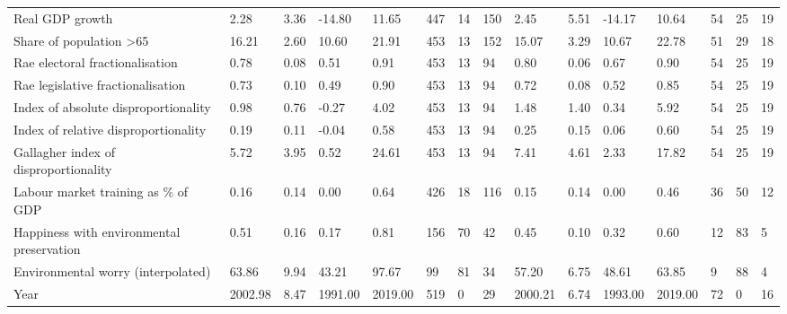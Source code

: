 \begin{longtable}{lllllllllllllll}
Real GDP growth & 2.28 & 3.36 & -14.80 & 11.65 & 447 & 14 & 150 & 2.45 & 5.51 & -14.17 & 10.64 & 54 & 25 & 19\\
Share of population >65 & 16.21 & 2.60 & 10.60 & 21.91 & 453 & 13 & 152 & 15.07 & 3.29 & 10.67 & 22.78 & 51 & 29 & 18\\
\addlinespace
Rae electoral fractionalisation & 0.78 & 0.08 & 0.51 & 0.91 & 453 & 13 & 94 & 0.80 & 0.06 & 0.67 & 0.90 & 54 & 25 & 19\\
Rae legislative fractionalisation & 0.73 & 0.10 & 0.49 & 0.90 & 453 & 13 & 94 & 0.72 & 0.08 & 0.52 & 0.85 & 54 & 25 & 19\\
Index of absolute disproportionality & 0.98 & 0.76 & -0.27 & 4.02 & 453 & 13 & 94 & 1.48 & 1.40 & 0.34 & 5.92 & 54 & 25 & 19\\
Index of relative disproportionality & 0.19 & 0.11 & -0.04 & 0.58 & 453 & 13 & 94 & 0.25 & 0.15 & 0.06 & 0.60 & 54 & 25 & 19\\
Gallagher index of disproportionality & 5.72 & 3.95 & 0.52 & 24.61 & 453 & 13 & 94 & 7.41 & 4.61 & 2.33 & 17.82 & 54 & 25 & 19\\
\addlinespace
Labour market training as \% of GDP & 0.16 & 0.14 & 0.00 & 0.64 & 426 & 18 & 116 & 0.15 & 0.14 & 0.00 & 0.46 & 36 & 50 & 12\\
Happiness with environmental preservation & 0.51 & 0.16 & 0.17 & 0.81 & 156 & 70 & 42 & 0.45 & 0.10 & 0.32 & 0.60 & 12 & 83 & 5\\
Environmental worry (interpolated) & 63.86 & 9.94 & 43.21 & 97.67 & 99 & 81 & 34 & 57.20 & 6.75 & 48.61 & 63.85 & 9 & 88 & 4\\
Year & 2002.98 & 8.47 & 1991.00 & 2019.00 & 519 & 0 & 29 & 2000.21 & 6.74 & 1993.00 & 2019.00 & 72 & 0 & 16\\
\bottomrule
\end{longtable}
